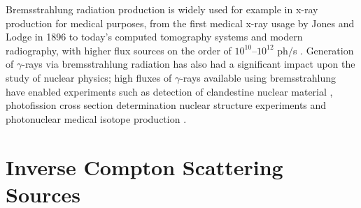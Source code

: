 \documentclass[../main.tex]{subfiles}
\begin{document}
Bremsstrahlung radiation production is widely used for example in x-ray production for medical purposes, from the first medical x-ray usage by Jones and Lodge in 1896 \cite{jones1896discovery} to today's computed tomography systems \cite{hounsfield1973computerized,cormack1963representation,cormack1964representation} and modern radiography, with higher flux sources on the order of $10^{10}$--$10^{12}$ ph/\si{\second} \cite{behling2018diagnostic}. Generation of $\gamma$-rays via bremsstrahlung radiation has also had a significant impact upon the study of nuclear physics; high fluxes of $\gamma$-rays available using bremsstrahlung have enabled experiments such as detection of clandestine nuclear material \cite{pruet2006detecting,jones2008bremsstrahlung}, photofission cross section determination nuclear structure experiments \cite{dickey1975u,naik2011mass} and photonuclear medical isotope production \cite{danon2008medical}.

\section{Inverse Compton Scattering Sources}
\label{sec:intro_ICS}
\end{document}
